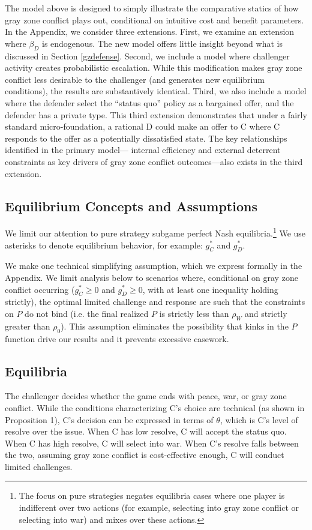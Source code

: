 \documentclass[11pt,letterpaper,pdftex,dvipsnames,table]{article}
\begin{document}
The model above is designed to simply illustrate the comparative statics of how gray zone conflict plays out, conditional on intuitive cost and benefit parameters. In the Appendix, we consider three extensions. First, we examine an extension where $\beta_{D}$ is endogenous. The new model offers little insight beyond what is discussed in Section \ref{gzdefense}. Second, we include a model where challenger activity creates probabilistic escalation. While this modification makes gray zone conflict less desirable to the challenger (and generates new equilibrium conditions), the results are substantively identical. Third, we also include a model where the defender select the ``status quo'' policy as a bargained offer, and the defender has a private type. This third extension demonstrates that under a  fairly standard micro-foundation, a rational D could make an offer to C where C responds to the offer as a potentially dissatisfied state. The key relationships identified in the primary model--- internal efficiency and external deterrent constraints as key drivers of gray zone conflict outcomes---also exists in the third extension.

\subsection{Equilibrium Concepts and Assumptions}
We limit our attention to pure strategy subgame perfect Nash equilibria.\footnote{The focus on pure strategies negates equilibria cases where one player is indifferent over two actions (for example, selecting into gray zone conflict or selecting into war) and mixes over these actions.} We use asterisks to denote equilibrium behavior, for example: $g_{C}^{*}$ and $g_{D}^{*}$.
    
We make one technical simplifying assumption, which we express formally in the Appendix. We limit analysis below to scenarios where, conditional on gray zone conflict occurring ($g_{C}^{*}\geq 0$ and $g_{D}^{*}\geq 0$, with at least one inequality holding strictly), the optimal limited challenge and response are such that the constraints on $P$ do not bind (i.e. the final realized $P$ is strictly less than $\rho_W$ and strictly greater than $\rho_{0}$). This assumption eliminates the possibility that kinks in the $P$ function drive our results and it prevents excessive casework.

\subsection{Equilibria}
The challenger decides whether the game ends with peace, war, or gray zone conflict. While the conditions characterizing C's choice are technical (as shown in Proposition 1), C's decision can be expressed in terms of $\theta$, which is C's level of resolve over the issue. When C has low resolve, C will accept the status quo. When C has high resolve, C will select into war. When C's resolve falls between the two, assuming gray zone conflict is cost-effective enough, C will conduct limited challenges.
    
\end{document}
